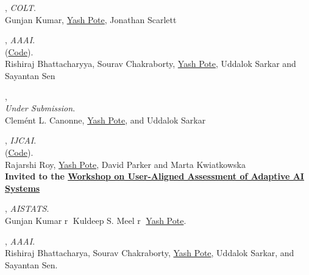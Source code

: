 \documentclass[12pt,letterpaper]{report}
\begin{document}
	\begin{tablist}
		\item[2026] ,		
		\textit{COLT}.\\
		Gunjan Kumar, \underline{Yash Pote},  Jonathan Scarlett
		
		\item[2025] , 
		\textit{AAAI}.\\
		(\href{https://github.com/uddaloksarkar/lachesis }{Code}).\\
		Rishiraj Bhattacharyya, Sourav Chakraborty, \underline{Yash Pote},  Uddalok Sarkar and Sayantan Sen
		
		\item[2025] , \\
		\textit{Under Submission}.
		\\ %
		Clemént L. Canonne, \underline{Yash Pote}, and Uddalok Sarkar
		
		\item[2025] , \textit{IJCAI}. \\
		(\href{https://github.com/rajarshi008/PriTL}{Code}).\\
		Rajarshi Roy, \underline{Yash Pote}, David Parker and Marta Kwiatkowska\\
		\textbf{Invited to the \href{https://aair-lab.github.io/aia2025/}{Workshop on User-Aligned Assessment of Adaptive AI Systems}}
		
		\item[2025] , \textit{AISTATS}.\\
		Gunjan Kumar \textcircled{r}  Kuldeep S. Meel \textcircled{r} \underline{Yash Pote}.
		
		\item[2024] ,  \textit{AAAI}.\\ %
		Rishiraj Bhattacharya, Sourav Chakraborty, \underline{Yash Pote}, Uddalok Sarkar, and Sayantan Sen.
		

\end{tablist}
\end{document}
